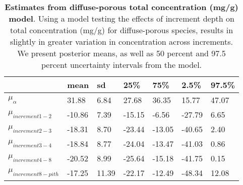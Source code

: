 \documentclass{article}\usepackage[]{graphicx}\usepackage[]{color}
\begin{document}
\begin{table}[ht]
\centering
\caption{\textbf{Estimates from diffuse-porous total concentration (mg/g) model}. Using a model testing the effects of increment depth on total concentration (mg/g) for diffuse-porous species, results in slightly in greater variation in concentration across increments. We present posterior means, as well as 50 percent and 97.5 percent uncertainty intervals from the model.} 
\label{tab:lat}
\begingroup\footnotesize
\begin{tabular}{|p{}|p{}|p{}|p{}|p{}|p{}|p{}|}
  \hline
 & mean & sd & 25\% & 75\% & 2.5\% & 97.5\% \\ 
  \hline
$\mu_{\alpha}$ & 31.88 & 6.84 & 27.68 & 36.35 & 15.77 & 47.07 \\ 
  $\mu_{increment 1-2}$ & -10.86 & 7.39 & -15.15 & -6.56 & -27.79 & 6.65 \\ 
  $\mu_{increment 2-3}$ & -18.31 & 8.70 & -23.44 & -13.05 & -40.65 & 2.40 \\ 
  $\mu_{increment 3-4}$ & -18.84 & 8.77 & -24.04 & -13.47 & -41.03 & 0.86 \\ 
  $\mu_{increment 4-8}$ & -20.52 & 8.99 & -25.64 & -15.18 & -41.75 & 0.15 \\ 
  $\mu_{increment 8-pith}$ & -17.25 & 11.39 & -22.17 & -12.49 & -48.34 & 12.08 \\ 
   \hline
\end{tabular}
\endgroup
\end{table}
\end{document}
